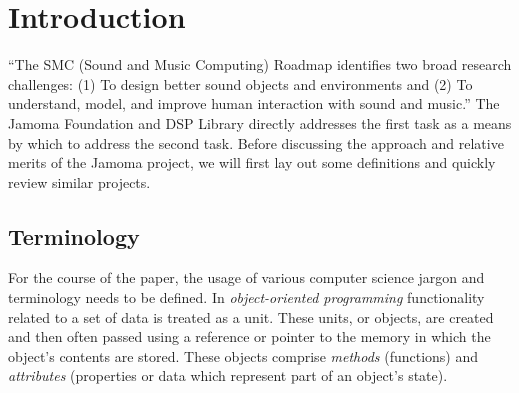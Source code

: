\documentclass[twoside,10pt]{article}
\affiliation{}{}
\title{\papertitle}
\begin{document}
\sloppy
{} %
    
\maketitle


\begin{abstract}

This paper presents an object-oriented, reflective, application framework for C++, with an emphasis on real-time signal processing. 
The Jamoma Foundation and DSP Library provide a runtime environment and an expanding collection of unit generators for synthesis, processing, and analysis.  It makes use of polymorphic typing, dynamic binding, and introspection to create a cross-platform API pulling ideas from languages such as Smalltalk and Objective-C while remaining within the bounds of the portable and cross-platform C++ context. 
Over the past several years this library has been used in both open source and commercial software projects in the sound and music computing field.

\end{abstract}



\section{Introduction} %
\label{sec:introduction}

``The SMC (Sound and Music Computing) Roadmap identifies two broad research challenges: (1) To design better sound objects and environments and (2) To understand, model, and improve human interaction with sound and music.'' \cite{serra:2007}  The Jamoma Foundation and DSP Library directly addresses the first task as a means by which to address the second task.  Before discussing the approach and relative merits of the Jamoma project, we will first lay out some definitions and quickly review similar projects.


\subsection{Terminology} %

For the course of the paper, the usage of various computer science jargon and terminology needs to be defined.  In \emph{object-oriented programming} functionality related to a set of data is treated as a unit.  These units, or objects, are created and then often passed using a reference or pointer to the memory in which the object's contents are stored.  These objects comprise \emph{methods} (functions) and \emph{attributes} (properties or data which represent part of an object's state).
\end{document}
